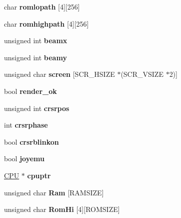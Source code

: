\begin{DoxyCompactItemize}
char {\bfseries romlopath} \mbox{[}4\mbox{]}\mbox{[}256\mbox{]}
\item 
\mbox{\label{class_t_e_d_a5ea7311ec2e229ffb262557f8a5acc56}} 
char {\bfseries romhighpath} \mbox{[}4\mbox{]}\mbox{[}256\mbox{]}
\item 
\mbox{\label{class_t_e_d_ad86cc2c96ac137dcf597a2f4c8a45f92}} 
unsigned int {\bfseries beamx}
\item 
\mbox{\label{class_t_e_d_aac1147947450a54526680cce32ea0f22}} 
unsigned int {\bfseries beamy}
\item 
\mbox{\label{class_t_e_d_a8e7031a33b32ea3791ffcfc7a8a4b5b0}} 
unsigned char {\bfseries screen} \mbox{[}S\+C\+R\+\_\+\+H\+S\+I\+ZE $\ast$(S\+C\+R\+\_\+\+V\+S\+I\+ZE $\ast$2)\mbox{]}
\item 
\mbox{\label{class_t_e_d_a48cc6d41168564e91fda266044c2bd1d}} 
bool {\bfseries render\+\_\+ok}
\item 
\mbox{\label{class_t_e_d_a41746d32cef983c2a90fffeacd83fc20}} 
unsigned int {\bfseries crsrpos}
\item 
\mbox{\label{class_t_e_d_aea23dff26df046b051871a091aef0c2d}} 
int {\bfseries crsrphase}
\item 
\mbox{\label{class_t_e_d_ad2af9be29d1750914a41fa62bfd53666}} 
bool {\bfseries crsrblinkon}
\item 
\mbox{\label{class_t_e_d_a55ea3eb83f6c08c51f1c1f6b3d160de4}} 
bool {\bfseries joyemu}
\item 
\mbox{\label{class_t_e_d_a9a7a798ad6e77ca8b33c40818ea95dba}} 
\mbox{\hyperlink{class_c_p_u}{C\+PU}} $\ast$ {\bfseries cpuptr}
\item 
\mbox{\label{class_t_e_d_a96c87558a260b302d1c4b7c98a94e75e}} 
unsigned char {\bfseries Ram} \mbox{[}R\+A\+M\+S\+I\+ZE\mbox{]}
\item 
\mbox{\label{class_t_e_d_a838078f0762acc0a7f6db03454b46f33}} 
unsigned char {\bfseries Rom\+Hi} \mbox{[}4\mbox{]}\mbox{[}R\+O\+M\+S\+I\+ZE\mbox{]}

\end{DoxyCompactItemize}
